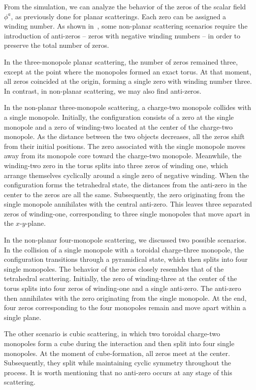 \documentclass[aps, prd, twocolumn, superscriptaddress, preprintnumbers, nofootinbib, longbibliography]{revtex4-1}
\begin{document}
From the simulation, we can analyze the behavior of the zeros of the scalar field $\phi^a$, as previously done for planar scatterings. Each zero can be assigned a winding number. As shown in~\cite{Sutcliffe:1996he}, some non-planar scattering scenarios require the introduction of anti-zeros -- zeros with negative winding numbers -- in order to preserve the total number of zeros.

In the three-monopole planar scattering, the number of zeros remained three, except at the point where the monopoles formed an exact torus. At that moment, all zeros coincided at the origin, forming a single zero with winding number three. In contrast, in non-planar scattering, we may also find anti-zeros. 

In the non-planar three-monopole scattering, a charge-two monopole collides with a single monopole. 
Initially, the configuration consists of a zero at the single monopole and a zero of winding-two located at the center of the charge-two monopole. As the distance between the two objects decreases, all the zeros shift from their initial positions. The zero associated with the single monopole moves away from its monopole core toward the charge-two monopole. Meanwhile, the winding-two zero in the torus splits into three zeros of winding one, which arrange themselves cyclically around a single zero of negative winding. When the configuration forms the tetrahedral state, the distances from the anti-zero in the center to the zeros are all the same. Subsequently, the zero originating from the single monopole annihilates with the central anti-zero. This leaves three separated zeros of winding-one, corresponding to three single monopoles that move apart in the $x$-$y$-plane.

In the non-planar four-monopole scattering, we discussed two possible scenarios. In the collision of a single monopole with a toroidal charge-three monopole, the configuration transitions through a pyramidical state, which then splits into four single monopoles.
The behavior of the zeros closely resembles that of the tetrahedral scattering. Initially, the zero of winding-three at the center of the torus splits into four zeros of winding-one and a single anti-zero. The anti-zero then annihilates with the zero originating from the single monopole. At the end, four zeros corresponding to the four monopoles remain and move apart within a single plane.

The other scenario is cubic scattering, in which two toroidal charge-two monopoles form a cube during the interaction and then split into four single monopoles. At the moment of cube-formation, all zeros meet at the center. Subsequently, they split while maintaining cyclic symmetry throughout the process. It is worth mentioning that no anti-zero occurs at any stage of this scattering.
\end{document}
